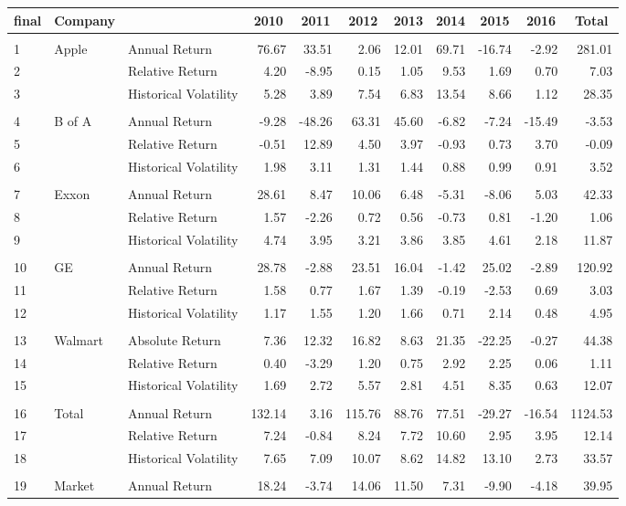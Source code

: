 \begin{table}[!tbp]
{\centering
\begin{tabular}{lllrrrrrrrr}
\hline\hline
\multicolumn{1}{l}{final}&\multicolumn{1}{c}{Company}&\multicolumn{1}{c}{ }&\multicolumn{1}{c}{2010}&\multicolumn{1}{c}{2011}&\multicolumn{1}{c}{2012}&\multicolumn{1}{c}{2013}&\multicolumn{1}{c}{2014}&\multicolumn{1}{c}{2015}&\multicolumn{1}{c}{2016}&\multicolumn{1}{c}{Total}\tabularnewline
\hline
&&&&&&&&&&\tabularnewline
1& Apple&Annual Return& 76.67& 33.51&  2.06&12.01&69.71&-16.74& -2.92& 281.01\tabularnewline
2&&Relative Return&  4.20& -8.95&  0.15& 1.05& 9.53&  1.69&  0.70&   7.03\tabularnewline
3&&Historical Volatility&  5.28&  3.89&  7.54& 6.83&13.54&  8.66&  1.12&  28.35\tabularnewline
\hline
&&&&&&&&&&\tabularnewline
4&B of A&Annual Return& -9.28&-48.26& 63.31&45.60&-6.82& -7.24&-15.49&  -3.53\tabularnewline
5&&Relative Return& -0.51& 12.89&  4.50& 3.97&-0.93&  0.73&  3.70&  -0.09\tabularnewline
6&&Historical Volatility&  1.98&  3.11&  1.31& 1.44& 0.88&  0.99&  0.91&   3.52\tabularnewline
\hline
&&&&&&&&&&\tabularnewline
7&Exxon&Annual Return& 28.61&  8.47& 10.06& 6.48&-5.31& -8.06&  5.03&  42.33\tabularnewline
8&&Relative Return&  1.57& -2.26&  0.72& 0.56&-0.73&  0.81& -1.20&   1.06\tabularnewline
9&&Historical Volatility&  4.74&  3.95&  3.21& 3.86& 3.85&  4.61&  2.18&  11.87\tabularnewline
\hline
&&&&&&&&&&\tabularnewline
10&GE&Annual Return& 28.78& -2.88& 23.51&16.04&-1.42& 25.02& -2.89& 120.92\tabularnewline
11&&Relative Return&  1.58&  0.77&  1.67& 1.39&-0.19& -2.53&  0.69&   3.03\tabularnewline
12&&Historical Volatility&  1.17&  1.55&  1.20& 1.66& 0.71&  2.14&  0.48&   4.95\tabularnewline
\hline
&&&&&&&&&&\tabularnewline
13&Walmart&Absolute Return&  7.36& 12.32& 16.82& 8.63&21.35&-22.25& -0.27&  44.38\tabularnewline
14&&Relative Return&  0.40& -3.29&  1.20& 0.75& 2.92&  2.25&  0.06&   1.11\tabularnewline
15&&Historical Volatility&  1.69&  2.72&  5.57& 2.81& 4.51&  8.35&  0.63&  12.07\tabularnewline
\hline
&&&&&&&&&&\tabularnewline
16&Total&Annual Return&132.14&  3.16&115.76&88.76&77.51&-29.27&-16.54&1124.53\tabularnewline
17&&Relative Return&  7.24& -0.84&  8.24& 7.72&10.60&  2.95&  3.95&  12.14\tabularnewline
18&&Historical Volatility&  7.65&  7.09& 10.07& 8.62&14.82& 13.10&  2.73&  33.57\tabularnewline
\hline
&&&&&&&&&&\tabularnewline
19&Market&Annual Return& 18.24& -3.74& 14.06&11.50& 7.31& -9.90& -4.18&  39.95\tabularnewline
\hline
\end{tabular}}

\end{table}
